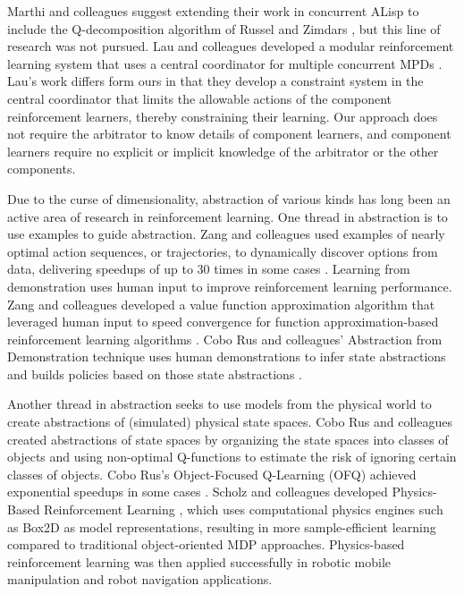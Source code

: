 Marthi and colleagues \cite{marthi2005concurrent} suggest extending their work in concurrent ALisp to include the Q-decomposition algorithm of Russel and Zimdars \cite{russell2003q-decomposition}, but this line of research was not pursued. Lau and colleagues developed a modular reinforcement learning system that uses a central coordinator for multiple concurrent MPDs \cite{lau2012coordination}. Lau's work differs form ours in that they develop a constraint system in the central coordinator that limits the allowable actions of the component reinforcement learners, thereby constraining their learning. Our approach does not require the arbitrator to know details of component learners, and component learners require no explicit or implicit knowledge of the arbitrator or the other components.

Due to the curse of dimensionality, abstraction of various kinds has long been an active area of research in reinforcement learning. One thread in abstraction is to use examples to guide abstraction. Zang and colleagues used examples of nearly optimal action sequences, or trajectories, to dynamically discover options from data, delivering speedups of up to 30 times in some cases \cite{zang2009discovering}. Learning from demonstration \cite{zang2010batch} uses human input to improve reinforcement learning performance. Zang and colleagues developed a value function approximation algorithm that leveraged human input to speed convergence for function approximation-based reinforcement learning algorithms \cite{zang2010using}. Cobo Rus and colleagues' Abstraction from Demonstration technique uses human demonstrations to infer state abstractions and builds policies based on those state abstractions \cite{cobo-rus2011automatic,cobo-rus2012automatic,cobo-rus2014abstraction}.

Another thread in abstraction seeks to use models from the physical world to create abstractions of (simulated) physical state spaces. Cobo Rus and colleagues created abstractions of state spaces by organizing the state spaces into classes of objects and using non-optimal Q-functions to estimate the risk of ignoring certain classes of objects. Cobo Rus's Object-Focused Q-Learning (OFQ) achieved exponential speedups in some cases \cite{cobo-rus2013object}. Scholz and colleagues developed Physics-Based Reinforcement Learning \cite{scholz2014physics}, which uses computational physics engines such as Box2D \cite{catto2013box2d} as model representations, resulting in more sample-efficient learning compared to traditional object-oriented MDP approaches. Physics-based reinforcement learning was then applied successfully in robotic mobile manipulation \cite{scholz2015learning} and robot navigation \cite{scholz2016navigating} applications.


